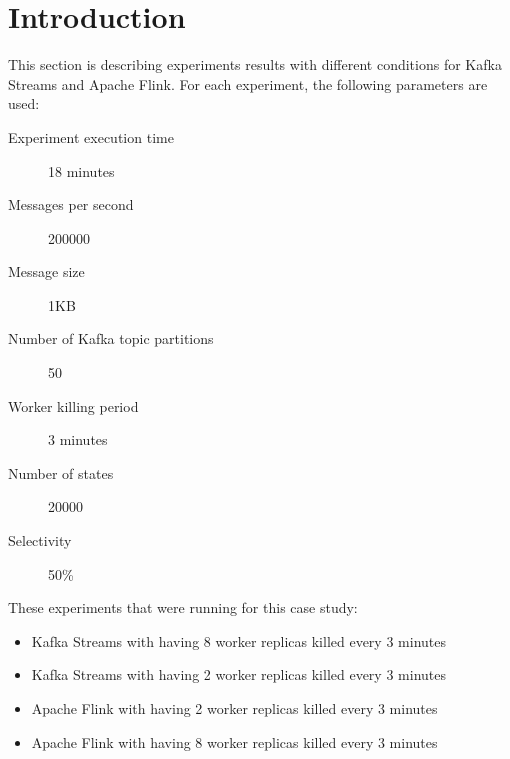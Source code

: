 \section{Introduction}\label{sec:introduction-results}
This section is describing experiments results with different conditions
for Kafka Streams and Apache Flink.
For each experiment, the following parameters are used:

\begin{description}
    \item[Experiment execution time] 18 minutes
    \item[Messages per second] 200000
    \item[Message size] 1KB
    \item[Number of Kafka topic partitions] 50
    \item[Worker killing period] 3 minutes
    \item[Number of states] 20000
    \item[Selectivity] 50\%
\end{description}


These experiments that were running for this case study:

\begin{itemize}
    \item Kafka Streams with having 8 worker replicas killed every 3 minutes
    \item Kafka Streams with having 2 worker replicas killed every 3 minutes
    \item Apache Flink with having 2 worker replicas killed every 3 minutes
    \item Apache Flink with having 8 worker replicas killed every 3 minutes
\end{itemize}


